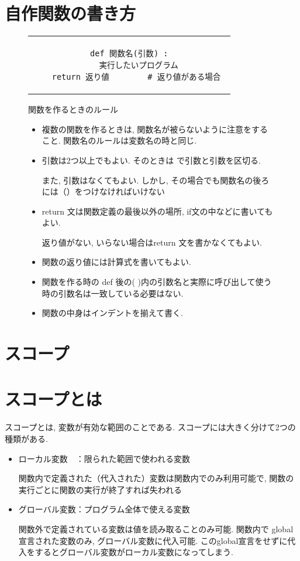 \documentclass[dvipdfmx]{jsbook}
\newcommand{\countup}[1]{\setcounter{chapter}{#1} \setcounter{section}{0}}
\begin{document}
\section{自作関数の書き方}
\begin{figure}[htp]
	\begin{tabular}{c}
		\begin{minipage}[ht]{.6\textwidth}
			\begin{lstlisting}[caption=自作関数の書き方]
def 関数名(引数) :
	実行したいプログラム
	return 返り値        # 返り値がある場合 \end{lstlisting}
		\end{minipage}
	\end{tabular}

	\begin{itembox}[l]{関数を作るときのルール}
		\begin{itemize}
			\item 複数の関数を作るときは, 関数名が被らないように注意をすること.  関数名のルールは変数名の時と同じ.
			\item 引数は2つ以上でもよい. そのときは {\textgt {,}}で引数と引数を区切る. \par
			      また, 引数はなくてもよい. しかし, その場合でも関数名の後ろには（）をつけなければいけない
			\item return 文は関数定義の最後以外の場所, if文の中などに書いてもよい. \par 返り値がない, いらない場合はreturn 文を書かなくてもよい.
			\item 関数の返り値には計算式を書いてもよい.
			\item 関数を作る時の def 後の( )内の引数名と実際に呼び出して使う時の引数名は一致している必要はない.
			\item 関数の中身はインデントを揃えて書く.
		\end{itemize}
	\end{itembox}
\end{figure}

\section*{スコープ}
\countup{9}
\section{スコープとは}
スコープとは, 変数が有効な範囲のことである. スコープには大きく分けて2つの種類がある. \par
\begin{itemize}
	\item {ローカル変数　：限られた範囲で使われる変数} \par
	      関数内で定義された（代入された）変数は関数内でのみ利用可能で, 関数の実行ごとに関数の実行が終了すれば失われる

	\item {グローバル変数：プログラム全体で使える変数} \par
	      関数外で定義されている変数は値を読み取ることのみ可能.
	      関数内で global 宣言された変数のみ, グローバル変数に代入可能.
	      このglobal宣言をせずに代入をするとグローバル変数がローカル変数になってしまう.
\end{itemize}
\end{document}
